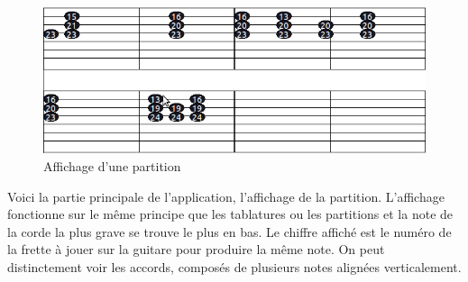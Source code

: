 \begin{figure}[H]
\centering
\includegraphics[scale=0.5]{Part}
\caption{Affichage d'une partition}
\end{figure}
Voici la partie principale de l'application, l'affichage de la partition. L'affichage fonctionne sur le même principe que les tablatures ou les 
partitions et la note de la corde la plus grave se trouve le plus en bas. Le chiffre affiché est le numéro de la frette à jouer sur la guitare pour 
produire la même note. On peut distinctement voir les accords, composés de plusieurs notes alignées verticalement.